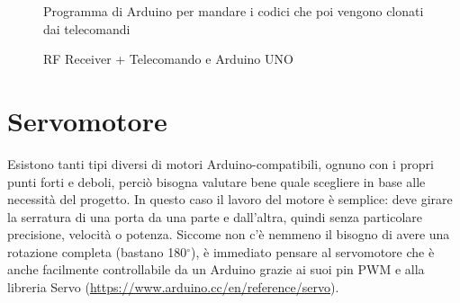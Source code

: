 \documentclass[12pt]{report}
\begin{document}
\begin{figure}
	\caption{Programma di Arduino per mandare i codici che poi vengono clonati dai telecomandi}
	\label{fig:clone_code}
\end{figure}

\begin{figure}
	\caption{RF Receiver + Telecomando e Arduino UNO}
	\label{fig:rf_uno}
\end{figure}

\pagebreak

%
\section{Servomotore}\label{sec:servomotore}
%

Esistono tanti tipi diversi di motori Arduino-compatibili, ognuno con i propri punti forti e deboli, perciò bisogna valutare bene quale scegliere in base alle necessità del progetto. In questo caso il lavoro del motore è semplice: deve girare la serratura di una porta da una parte e dall'altra, quindi senza particolare precisione, velocità o potenza. Siccome non c'è nemmeno il bisogno di avere una rotazione completa (bastano 180$^{\circ}$), è immediato pensare al servomotore che è anche facilmente controllabile da un Arduino grazie ai suoi pin PWM e alla libreria Servo (\url{https://www.arduino.cc/en/reference/servo}).
\end{document}
